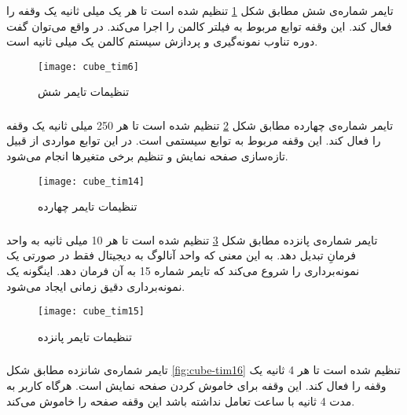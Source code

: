 \subsubsection{}
تایمر شماره‌ی شش مطابق شکل \ref{fig:cube-tim6} تنظیم شده است تا هر یک میلی ثانیه یک وقفه را فعال کند. این وقفه توابع مربوط به فیلتر کالمن را اجرا می‌کند. در واقع می‌توان گفت دوره تناوب نمونه‌گیری و پردازش سیستم کالمن یک میلی ثانیه است.

	\begin{figure}[h]
		\centering
		\texttt{[image: cube\_tim6]}
		\caption{تنظیمات تایمر شش}
		\label{fig:cube-tim6}
	\end{figure}

\subsubsection{}
تایمر شماره‌ی چهارده مطابق شکل \ref{fig:cube-tim14} تنظیم شده است تا هر 250 میلی ثانیه یک وقفه را فعال کند. این وقفه مربوط به توابع سیستمی است. در این توابع مواردی از قبیل تازه‌سازی صفحه نمایش و تنظیم برخی متغیرها انجام می‌شود.


	\begin{figure}[h]
		\centering
		\texttt{[image: cube\_tim14]}
		\caption{تنظیمات تایمر چهارده}
		\label{fig:cube-tim14}
	\end{figure}

\subsubsection{}
تایمر شماره‌ی پانزده مطابق شکل \ref{fig:cube-tim15} تنظیم شده است تا هر 10 میلی ثانیه به واحد  فرمانِ تبدیل دهد. به این معنی که واحد آنالوگ به دیجیتال فقط در صورتی یک نمونه‌برداری را شروع می‌کند که تایمر شماره 15 به آن فرمان دهد. اینگونه یک نمونه‌برداری دقیق زمانی ایجاد می‌شود.

	\begin{figure}[h]
		\centering
		\texttt{[image: cube\_tim15]}
		\caption{تنظیمات تایمر پانزده}
		\label{fig:cube-tim15}
	\end{figure}

\subsubsection{}
تایمر شماره‌ی شانزده مطابق شکل \ref{fig:cube-tim16} تنظیم شده است تا هر 4 ثانیه یک وقفه را فعال کند. این وقفه برای خاموش کردن صفحه نمایش است. هرگاه کاربر به مدت 4 ثانیه با ساعت تعامل نداشته باشد این وقفه صفحه را خاموش می‌کند.

